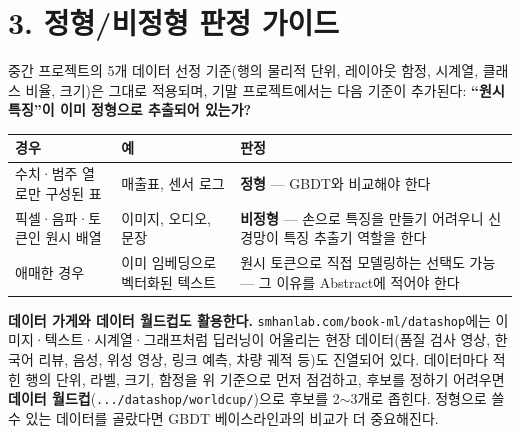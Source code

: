 \documentclass[12pt]{article}
\begin{document}
\section*{3. 정형/비정형 판정 가이드}
중간 프로젝트의 5개 데이터 선정 기준(행의 물리적 단위, 레이아웃 함정,
시계열, 클래스 비율, 크기)은 그대로 적용되며, 기말 프로젝트에서는 다음
기준이 추가된다: \textbf{``원시 특징''이 이미 정형으로 추출되어
있는가?}
\begin{center}
\small
\begin{tabular}{@{}p{3.0cm}p{5.2cm}p{5.5cm}@{}}
\toprule
경우 & 예 & 판정 \\
\midrule
수치·범주 열로만 구성된 표 & 매출표, 센서 로그 & \textbf{정형}
--- GBDT와 비교해야 한다 \\
픽셀·음파·토큰인 원시 배열 & 이미지, 오디오, 문장 &
\textbf{비정형} --- 손으로 특징을 만들기 어려우니 신경망이 특징
추출기 역할을 한다 \\
애매한 경우 & 이미 임베딩으로 벡터화된 텍스트 & 원시 토큰으로
직접 모델링하는 선택도 가능 --- 그 이유를 Abstract에 적어야 한다 \\
\bottomrule
\end{tabular}
\end{center}

\vspace{4pt}
\noindent\textbf{데이터 가게와 데이터 월드컵도 활용한다.} \texttt{smhanlab.com/book-ml/datashop}에는 이미지·텍스트·시계열·그래프처럼 딥러닝이 어울리는 현장 데이터(품질 검사 영상, 한국어 리뷰, 음성, 위성 영상, 링크 예측, 차량 궤적 등)도 진열되어 있다. 데이터마다 적힌 행의 단위, 라벨, 크기, 함정을 위 기준으로 먼저 점검하고, 후보를 정하기 어려우면 \textbf{데이터 월드컵}(\texttt{.../datashop/worldcup/})으로 후보를 2$\sim$3개로 좁힌다. 정형으로 쓸 수 있는 데이터를 골랐다면 GBDT 베이스라인과의 비교가 더 중요해진다.
\end{document}
